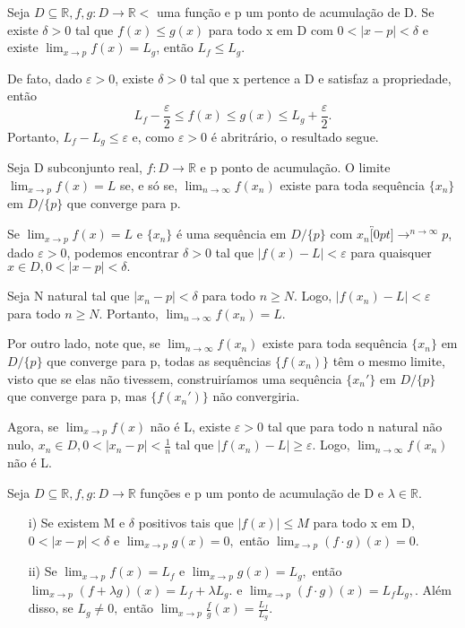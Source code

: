 \documentclass[Analysis/analysis_notes.tex]{subfiles}
\begin{document}
\begin{theorem*}
	Seja $D\subseteq{\mathbb{R}}, f, g:D\rightarrow \mathbb{R}<$ uma fun\c c\~ao e p um ponto de acumula\c c\~ao de D. Se existe $\delta > 0$
	tal que $f(x)\leq{g(x)}$ para todo x em D com $0 <|x-p|<\delta$ e existe $\lim_{x\to p}f(x) = L_{g}$, ent\~ao $L_{f}\leq{L_{g}}.$
\end{theorem*}
\begin{proof*}
	De fato, dado $\varepsilon > 0$, existe $\delta > 0$ tal que x pertence a D e satisfaz a propriedade, ent\~ao
	$$
		L_{f} - \frac{\varepsilon}{2} \leq{f(x)}\leq{g(x)}\leq{L_{g}+\frac{\varepsilon}{2}.}
	$$
	Portanto, $L_{f}-L_{g}\leq{\varepsilon}$ e, como $\varepsilon > 0$ \'e abritr\'ario, o resultado segue. \qedsymbol
\end{proof*}
\begin{theorem*}
	Seja D subconjunto real, $f:D\rightarrow \mathbb{R}$ e p ponto de acumula\c c\~ao. O limite $\lim_{x\to p}f(x)=L$ se, e s\'o se,
	$\lim_{n\to\infty}f(x_{n})$ existe para toda sequ\^encia $\{x_{n}\}$ em $D/\{p\}$ que converge para p.
\end{theorem*}
\begin{proof*}
	Se $\lim_{x\to p }f(x) = L$ e $\{x_{n}\}$ \'e uma sequ\^encia em $D/\{p\}$ com $x_{n}\overbracket[0pt]{\longrightarrow}^{n\to \infty}p$, dado
	$\varepsilon > 0$, podemos encontrar $\delta > 0$ tal que $|f(x)-L|<\varepsilon$ para quaisquer $x\in D, 0<|x-p|<\delta.$

	Seja N natural tal que $|x_{n}-p|<\delta$ para todo $n\geq{N}.$ Logo, $|f(x_{n})-L| < \varepsilon$ para todo $n\geq{N}.$
	Portanto, $\lim_{n\to\infty}f(x_{n})=L.$

	Por outro lado, note que, se $\lim_{n\to\infty}f(x_{n})$ existe para toda sequ\^encia $\{x_{n}\}$ em $D/\{p\}$ que converge
	para p, todas as sequ\^encias $\{f(x_{n})\}$ t\^em o mesmo limite, visto que se elas n\~ao tivessem, construir\'iamos uma sequ\^encia
	$\{x_{n}'\}$ em $D/\{p\}$ que converge para p, mas $\{f(x_{n}')\}$ n\~ao convergiria.

	Agora, se $\lim_{x\to p}f(x)$ n\~ao \'e L, existe $\varepsilon > 0$ tal que para todo n natural n\~ao nulo, $x_{n}\in D, 0 <|x_{n}-p|<\frac{1}{n}$ tal
	que $|f(x_{n})-L|\geq{\varepsilon}$. Logo, $\lim_{n\to\infty}f(x_{n})$ n\~ao \'e L.\qedsymbol
\end{proof*}
\begin{theorem*}
	Seja $D\subseteq{\mathbb{R}}, f, g:D\rightarrow \mathbb{R}$ fun\c c\~oes e p um ponto de acumula\c c\~ao de D e $\lambda\in \mathbb{R}.$
	\begin{itemize}
		\item[i)] Se existem M e $\delta$ positivos tais que $|f(x)|\leq{M}$ para todo x em D, $0 <|x-p|<\delta$ e $\lim_{x\to p}g(x)=0,$
		      ent\~ao $\lim_{x\to p}(f \cdot g)(x) = 0.$
		\item[ii)] Se $\lim_{x\to p}f(x) = L_{f}$ e $\lim_{x\to p}g(x) = L_{g},$ ent\~ao $\lim_{x\to p}(f + \lambda g)(x) = L_{f} + \lambda L_{g}.$
		      e $\lim_{x\to p}(f \cdot g)(x) = L_{f}L_{g},$. Al\'em disso, se $L_{g}\neq0,$ ent\~ao $\lim_{x\to p}\frac{f}{g}(x) = \frac{L_{f}}{L_{g}}.$
	\end{itemize}
\end{theorem*}
\end{document}
